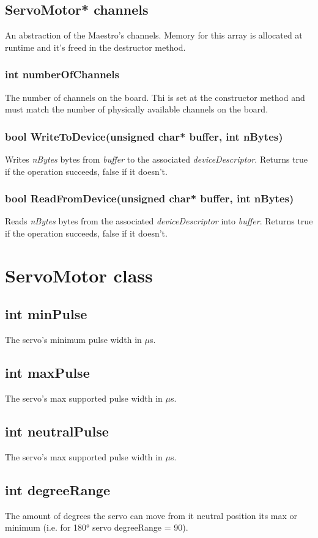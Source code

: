 \documentclass[letterpaper]{book}
\begin{document}
\subsection{	ServoMotor* channels}
An abstraction of the Maestro's channels. Memory for this array is allocated at runtime and it's freed in the destructor method.

\subsubsection{int numberOfChannels}
The number of channels on the board. Thi is set at the constructor method and must match the number of physically available channels on the board.

\subsubsection{bool WriteToDevice(unsigned char* buffer, int nBytes)}
Writes \textit{nBytes} bytes from \textit{buffer} to the associated \textit{deviceDescriptor}. Returns true if the operation succeeds, false if it doesn't.

\subsubsection{bool ReadFromDevice(unsigned char* buffer, int nBytes)}
Reads \textit{nBytes} bytes from the associated \textit{deviceDescriptor} into \textit{buffer}. Returns true if the operation succeeds, false if it doesn't.

	

\section{ServoMotor class}
\label{sec:ServoMotor}
\subsection{int minPulse}
The servo's minimum pulse width in $\mu$s.
\subsection{int maxPulse}
The servo's max supported pulse width in $\mu$s.
\subsection{int neutralPulse}
The servo's max supported pulse width in $\mu$s.
\subsection{int degreeRange}
The amount of degrees the servo can move from it neutral position its max or minimum (i.e. for 180° servo degreeRange = 90).
\end{document}
